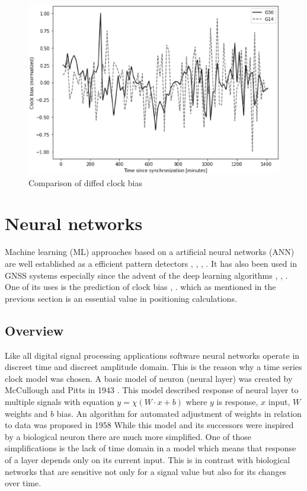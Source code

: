 \documentclass{article}
\begin{document}
\begin{figure}[htb] 
\centering
	\includegraphics[width=\textwidth]{figures/bias_normalized}
\caption{Comparison of diffed clock bias}
\label{fig:diffed_shifts}
\end{figure}

\FloatBarrier
\section{Neural networks}
Machine learning (ML) approaches based on a artificial neural networks (ANN) are
well established as a efficient pattern detectors \cite{Abiodun2019}, \cite{Faraway2008},
\cite{Khan2019}, \cite{Miller1993}.
It has also been used in GNSS systems especially since the advent of the deep learning
algorithms \cite{Kim2019}, \cite{Perez2019}, \cite{Wei2016}.
One of its uses is the prediction of clock bias  \cite{Indriyatmoko2008}, \cite{Wang2017}.
which as mentioned in the previous section is an essential value in positioning calculations.

\subsection{Overview}  
Like all digital signal processing applications software neural networks operate in
discreet time and discreet amplitude domain. This is the reason why a time series clock model
was chosen. A basic model of neuron (neural layer) was created by McCullough and Pitts in 1943
\cite{McCulloch1943}. This model described response of neural layer to multiple signals with
equation $y= \chi (W\cdot x+b)$ where $y$ is response, $x$ input, $W$ weights and $b$ bias.
An algorithm for automated adjustment of weights in relation to data was proposed in 1958
While this model and its successors were inspired by a biological neuron there are much
more simplified. One of those simplifications is the lack of time domain in a model which means
that response of a layer depends only on its current input.
This is in contrast with biological networks that are sensitive not only for a signal value
but also for its changes over time.
\end{document}
